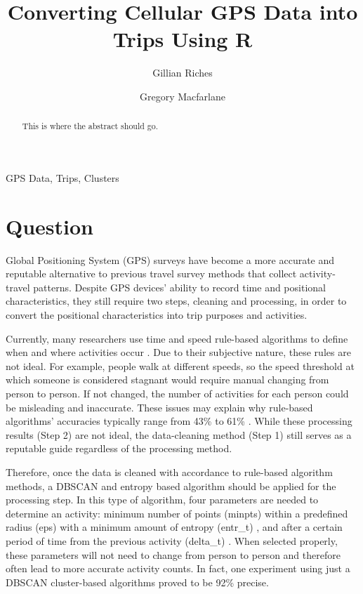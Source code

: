 \documentclass[3p, authoryear]{elsarticle} %
\begin{document}
\begin{frontmatter}

  \title{Converting Cellular GPS Data into Trips Using R}
    \author[Brigham Young University]{Gillian Riches}
    \author[Brigham Young University]{Gregory Macfarlane}
      \address[Brigham Young University]{Civil and Environmental Engineering Department, 232 Engineering Building, Provo, Utah 84602}
  
  \begin{abstract}
  This is where the abstract should go.
  \end{abstract}
   \begin{keyword} GPS Data, Trips, Clusters\end{keyword}
 \end{frontmatter}

\hypertarget{question}{%
\section{Question}\label{question}}

Global Positioning System (GPS) surveys have become a more accurate and reputable alternative to previous travel survey methods that collect activity-travel patterns. Despite GPS devices' ability to record time and positional characteristics, they still require two steps, cleaning and processing, in order to convert the positional characteristics into trip purposes and activities.

Currently, many researchers use time and speed rule-based algorithms to define when and where activities occur \citep{reviewOfMethods2014}. Due to their subjective nature, these rules are not ideal. For example, people walk at different speeds, so the speed threshold at which someone is considered stagnant would require manual changing from person to person. If not changed, the number of activities for each person could be misleading and inaccurate. These issues may explain why rule-based algorithms' accuracies typically range from 43\% to 61\% \citep{reviewOfMethods2014}. While these processing results (Step 2) are not ideal, the data-cleaning method (Step 1) still serves as a reputable guide regardless of the processing method.

Therefore, once the data is cleaned with accordance to rule-based algorithm methods, a DBSCAN and entropy based algorithm should be applied for the processing step. In this type of algorithm, four parameters are needed to determine an activity: minimum number of points (minpts) within a predefined radius (eps) with a minimum amount of entropy (entr\_t) \citep{GongInspiration}, and after a certain period of time from the previous activity (delta\_t) . When selected properly, these parameters will not need to change from person to person and therefore often lead to more accurate activity counts. In fact, one experiment \citep{DBAlgorithm2017} using just a DBSCAN cluster-based algorithms proved to be 92\% precise.
\end{document}
